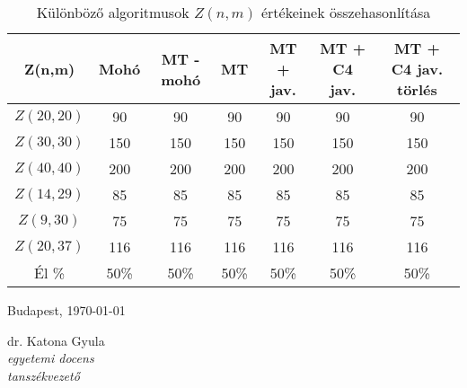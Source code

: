\documentclass[12pt,a4paper]{article}
\begin{document}
\begin{table}[H]
\centering
\begin{tabular}{|c|c|c|c|c|c|c|}
\hline
\textbf{Z(n,m)} & \textbf{Mohó} & \textbf{MT - mohó} & \textbf{MT} & \textbf{MT + jav.} & \textbf{MT + C4 jav.} & \textbf{MT + C4 jav. törlés} \\
\hline
$Z(20,20)$ & 90 & 90 & 90 & 90 & 90 & 90 \\
$Z(30,30)$ & 150 & 150 & 150 & 150 & 150 & 150 \\
$Z(40,40)$ & 200 & 200 & 200 & 200 & 200 & 200 \\
$Z(14,29)$ & 85 & 85 & 85 & 85 & 85 & 85 \\
$Z(9,30)$  & 75 & 75 & 75 & 75 & 75 & 75 \\
$Z(20,37)$ & 116 & 116 & 116 & 116 & 116 & 116 \\
\hline
Él \% & 50\% & 50\% & 50\% & 50\% & 50\% & 50\% \\
\hline
\end{tabular}
\caption{Különböző algoritmusok $Z(n,m)$ értékeinek összehasonlítása}
\end{table}


\vspace{1cm}\vfill
Budapest, \today
\begin{flushright}
\begin{minipage}{0.5\textwidth}
\begin{center}
	dr. Katona Gyula\\
	\textit{egyetemi docens}\\
	\textit{tanszékvezető}
\end{center}
\end{minipage}
\end{flushright}
\vfill
\end{document}
